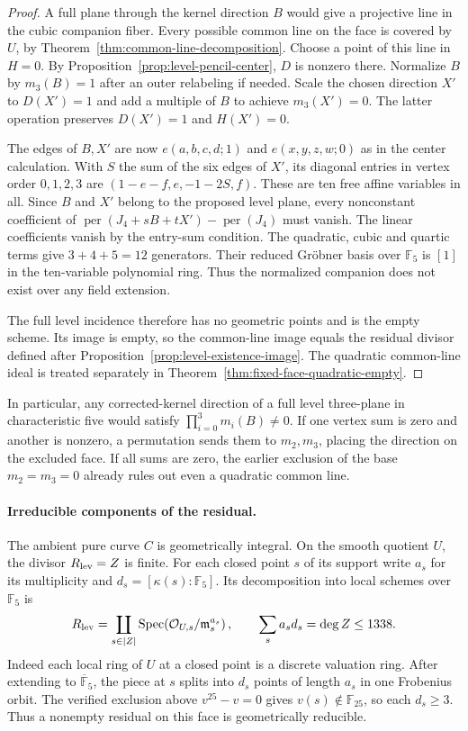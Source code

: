 \begin{proof}
A full plane through the kernel direction \(B\) would give a projective
line in the cubic companion fiber. Every possible common line on the
face is covered by \(U\), by Theorem~\ref{thm:common-line-decomposition}.
Choose a point of this line in \(H=0\). By
Proposition~\ref{prop:level-pencil-center}, \(D\) is nonzero there.
Normalize \(B\) by \(m_3(B)=1\) after an outer relabeling if needed.
Scale the chosen direction \(X'\) to \(D(X')=1\) and add a multiple
of \(B\) to achieve \(m_3(X')=0\). The latter operation preserves
\(D(X')=1\) and \(H(X')=0\).

The edges of \(B,X'\) are now \(e(a,b,c,d;1)\) and \(e(x,y,z,w;0)\)
as in the center calculation. With \(S\) the sum of the six edges of
\(X'\), its diagonal entries in vertex order \(0,1,2,3\) are
\((1-e-f,e,-1-2S,f)\). These are ten free affine variables in all.
Since \(B\) and \(X'\) belong to the proposed level plane, every
nonconstant coefficient of
\(\operatorname{per}(J_4+sB+tX')-\operatorname{per}(J_4)\) must
vanish. The linear coefficients vanish by the entry-sum condition.
The quadratic, cubic and quartic terms give \(3+4+5=12\)
generators. Their reduced Gröbner basis over \(\mathbb F_5\) is
\([1]\) in the ten-variable polynomial ring. Thus the normalized
companion does not exist over any field extension.

The full level incidence therefore has no geometric points and is the
empty scheme. Its image is empty, so the common-line image equals
the residual divisor defined after Proposition~\ref{prop:level-existence-image}.
The quadratic common-line ideal is treated separately in
Theorem~\ref{thm:fixed-face-quadratic-empty}.
\end{proof}

In particular, any corrected-kernel direction of a full level three-plane
in characteristic five would satisfy \(\prod_{i=0}^{3}m_i(B)\ne0\).
If one vertex sum is zero and another is nonzero, a permutation sends
them to \(m_2,m_3\), placing the direction on the excluded face. If
all sums are zero, the earlier exclusion of the base \(m_2=m_3=0\)
already rules out even a quadratic common line.

\paragraph{Irreducible components of the residual.}
The ambient pure curve \(C\) is geometrically
integral. On the smooth quotient \(U\), the divisor
\(R_{\rm lev}=Z\) is finite. For each closed point \(s\) of its support
write \(a_s\) for its multiplicity and \(d_s=[\kappa(s):\mathbb F_5]\).
Its decomposition into local schemes over \(\mathbb F_5\) is
\[
 R_{\rm lev}=\coprod_{s\in |Z|}
      \operatorname{Spec}\!\left(\mathcal O_{U,s}/\mathfrak m_s^{a_s}\right),
       \qquad \sum_s a_s d_s=\deg Z\le 1338 .
\]
Indeed each local ring of \(U\) at a closed point is a discrete
valuation ring. After extending to \(\overline{\mathbb F}_5\), the
piece at \(s\) splits into \(d_s\) points of length \(a_s\) in one
Frobenius orbit. The verified exclusion above \(v^{25}-v=0\) gives
\(v(s)\notin\mathbb F_{25}\), so each \(d_s\ge3\). Thus a nonempty
residual on this face is geometrically reducible.

